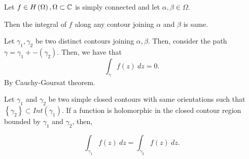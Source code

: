 \begin{lem}
	Let $f \in H\left( \Omega \right) , \Omega \subset \mathbb{C}$ is simply connected and let $\alpha, \beta \in  \Omega$.

	Then the integral of $f$ along any contour joining $\alpha$	and $\beta$ is same.  
	
\end{lem}

\begin{Proof}
	Let $\gamma_1, \gamma_2$ be two distinct contours joining $\alpha, \beta$. Then, consider the path $\gamma = \gamma_1 + -\left( \gamma_2 \right) $. Then, we have that 
	\[
	\int_{{\gamma}}^{{}} {f\left( z \right) } \: d{z} {} = 0
	.\]
	By Cauchy-Goursat theorem. 
\end{Proof}


\begin{lem}
	Let $\gamma_1$ and $\gamma_2$ be two simple closed contours with same orientations such that $\left\{ \gamma_2 \right\} \subset Int\left( \gamma_1 \right) $. If a function is holomorphic in the closed contour region bounded by $\gamma_1$ and $\gamma_2$, then, 

	\[
	\int_{{\gamma_1}}^{{}} {f\left( z \right) } \: d{z} {} = \int_{{\gamma_2}}^{{}} {f\left( z \right) } \: d{z} {} 
	.\] 
\end{lem}

